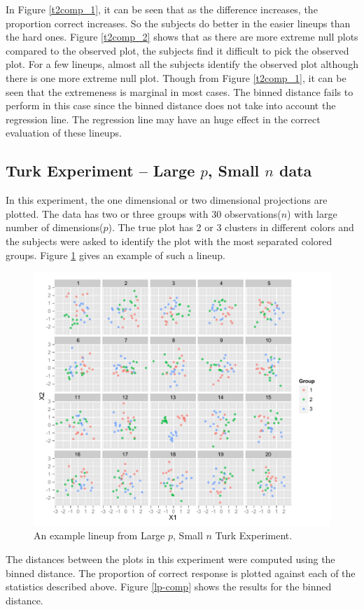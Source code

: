 \documentclass[12]{article}
\begin{document}
In Figure \ref{t2comp_1}, it can be seen that as the difference increases, the proportion correct increases. So the subjects do better in the easier lineups than the hard ones. Figure \ref{t2comp_2} shows that as there are more extreme null plots compared to the observed plot, the subjects find it difficult to pick the observed plot. For a few lineups, almost all the subjects identify the observed plot although there is one more extreme null plot. Though from Figure \ref{t2comp_1}, it can be seen that the extremeness is marginal in most cases. The binned distance fails to perform in this case since the binned distance does not take into account the regression line. The regression line may have an huge effect in the correct evaluation of these lineups.


\subsection{Turk Experiment -- Large $p$, Small $n$ data}

In this experiment, the one dimensional or two dimensional projections are plotted. The data has two or three groups with 30 observations($n$) with large number of dimensions($p$). The true plot has 2 or 3 clusters in different colors and the subjects were asked to identify the plot with the most separated colored groups. Figure \ref{largep} gives an example of such a lineup. 

\begin{figure}[htbp]
\centering
\includegraphics[width=.7\textwidth]{largep-example.pdf}
\caption{An example lineup from Large $p$, Small $n$ Turk Experiment.}
\label{largep}
\end{figure}

The distances between the plots in this experiment were computed using the binned distance. The proportion of correct response is plotted against each of the statistics described above. Figure \ref{lp-comp} shows the results for the binned distance.
\end{document}
